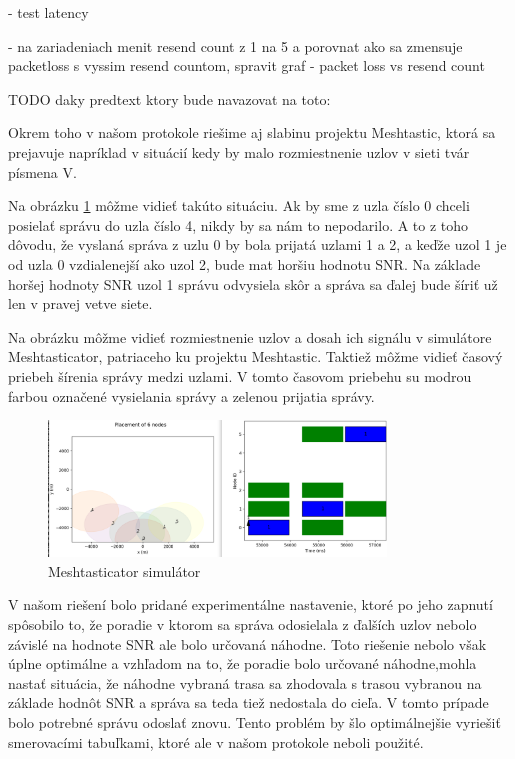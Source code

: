 \documentclass[slovak,master]{diploma}
\begin{document}
- test latency

- na zariadeniach menit resend count z 1 na 5 a porovnat ako sa zmensuje packetloss s vyssim resend countom, spravit graf - packet loss vs resend count

TODO daky predtext ktory bude navazovat na toto:

Okrem toho v našom protokole riešime aj slabinu projektu Meshtastic, ktorá sa
prejavuje napríklad v situácií kedy by malo rozmiestnenie uzlov v sieti tvár písmena V.

Na obrázku \ref{fig:mestasticV} môžme vidieť takúto situáciu. Ak by sme z uzla číslo 0 chceli posielať správu do uzla číslo 4, nikdy by sa nám to nepodarilo.
A to z toho dôvodu, že vyslaná správa z uzlu 0 by bola prijatá uzlami 1 a 2, a keďže uzol 1 je od uzla 0 vzdialenejší ako uzol 2, bude mat horšiu hodnotu SNR.
Na základe horšej hodnoty SNR uzol 1 správu odvysiela skôr a správa sa ďalej bude šíriť už len v pravej vetve siete.

Na obrázku môžme vidieť rozmiestnenie uzlov a dosah ich signálu v simulátore Meshtasticator, patriaceho ku projektu Meshtastic. Taktiež môžme vidieť časový priebeh šírenia správy medzi uzlami. 
V tomto časovom priebehu su modrou farbou označené vysielania správy a zelenou prijatia správy.

\begin{figure}[h!]
  \centering
  \includegraphics[width=0.8\textwidth]{Figures/meshtasticV.png}
  \caption{Meshtasticator simulátor}
  \label{fig:mestasticV}
\end{figure}

V našom riešení bolo pridané experimentálne nastavenie, ktoré po jeho zapnutí spôsobilo to, že poradie v ktorom sa správa odosielala z ďalších uzlov 
nebolo závislé na hodnote SNR ale bolo určovaná náhodne. Toto riešenie nebolo však úplne optimálne a vzhľadom na to, že poradie bolo určované 
náhodne,mohla nastať situácia, že náhodne vybraná trasa sa zhodovala s trasou vybranou 
na základe hodnôt SNR a správa sa teda tiež nedostala do cieľa. V tomto prípade bolo potrebné správu odoslať znovu. 
Tento problém by šlo optimálnejšie vyriešiť smerovacími tabuľkami, ktoré ale v našom protokole neboli použité.
\end{document}
